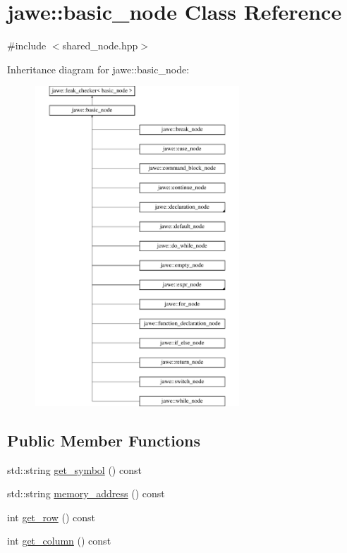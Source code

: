 \hypertarget{classjawe_1_1basic__node}{}\section{jawe\+:\+:basic\+\_\+node Class Reference}
\label{classjawe_1_1basic__node}


{\ttfamily \#include $<$shared\+\_\+node.\+hpp$>$}

Inheritance diagram for jawe\+:\+:basic\+\_\+node\+:\begin{figure}[H]
\begin{center}
\leavevmode
\includegraphics[height=12.000000cm]{classjawe_1_1basic__node}
\end{center}
\end{figure}
\subsection*{Public Member Functions}
\begin{DoxyCompactItemize}
\item 
std\+::string \hyperlink{classjawe_1_1basic__node_a06751766a924d6537794e8ff8e9958ff}{get\+\_\+symbol} () const
\item 
std\+::string \hyperlink{classjawe_1_1basic__node_a43ed68a61c23f89726070285f89245f5}{memory\+\_\+address} () const
\item 
int \hyperlink{classjawe_1_1basic__node_ac250c6262191048581228b8bba6eaebe}{get\+\_\+row} () const
\item 
int \hyperlink{classjawe_1_1basic__node_aafc0d609d65c9b16381d567bd7174c89}{get\+\_\+column} () const
\end{DoxyCompactItemize}
